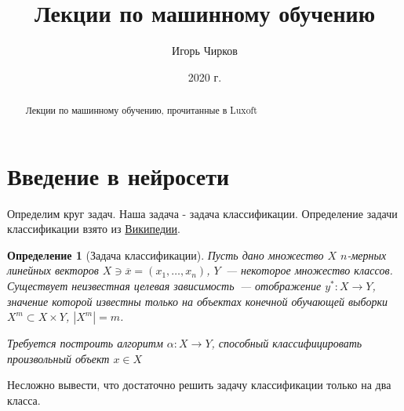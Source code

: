 \documentclass[12pt]{article}
\title{Лекции по машинному обучению}
\author{Игорь Чирков}
\date{2020 г.}
\newtheorem{definition}{Определение}
\begin{document}
    \begin{titlepage}
        \maketitle
    \end{titlepage}

    \begin{abstract}
        Лекции по машинному обучению, прочитанные в Luxoft
    \end{abstract}

    \section{Введение в нейросети}\label{sec:introduction-to-nnets}


    Определим круг задач.
    Наша задача - задача классификации.
    Определение задачи классификации взято из
    \href{https://en.wikipedia.org/wiki/Statistical_classification}{Википедии}.

    \begin{definition}[Задача классификации]
        Пусть дано множество $X$ $n$-мерных линейных векторов $X \ni \overline{x} = (x_1, \ldots, x_n)$,
        $Y$~--- некоторое множество классов.
        Существует неизвестная целевая зависимость~--- отображение $y^*: X\to Y$, значение которой известны только
        на объектах конечной обучающей выборки $X^m \subset X \times Y$, $| X^m | = m$.

        Требуется построить алгоритм $\alpha: X \to Y$, способный классифицировать произвольный объект
        $x \in X$
    \end{definition}

    Несложно вывести, что достаточно решить задачу классификации только на два класса.



\end{document}
